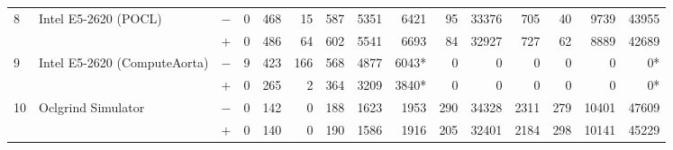 \begin{tabular}{lll | rrrrrr | rrrrrr }
\hline
\multirow{ 2}{*}{8} & \multirow{ 2}{*}{Intel E5-2620 (POCL)} & $-$ & 0 & 468 & 15 & 587 & 5351 & 6421       & 95 & 33376 & 705 & 40 & 9739 & 43955 \\& & $+$ & 0 & 486 & 64 & 602 & 5541 & 6693 & 84 & 32927 & 727 & 62 & 8889 & 42689 \\
\hline
\multirow{ 2}{*}{9} & \multirow{ 2}{*}{Intel E5-2620 (ComputeAorta)} & $-$ & 9 & 423 & 166 & 568 & 4877 & 6043*       & 0 & 0 & 0 & 0 & 0 & 0* \\& & $+$ & 0 & 265 & 2 & 364 & 3209 & 3840* & 0 & 0 & 0 & 0 & 0 & 0* \\
\hline
\multirow{ 2}{*}{10} & \multirow{ 2}{*}{Oclgrind Simulator} & $-$ & 0 & 142 & 0 & 188 & 1623 & 1953       & 290 & 34328 & 2311 & 279 & 10401 & 47609 \\& & $+$ & 0 & 140 & 0 & 190 & 1586 & 1916 & 205 & 32401 & 2184 & 298 & 10141 & 45229 \\
  \bottomrule
\end{tabular}

